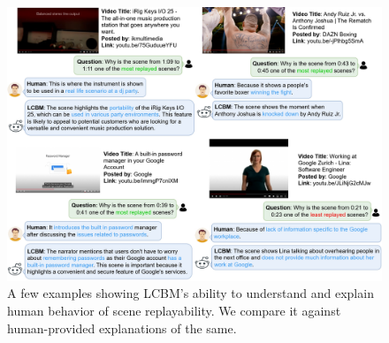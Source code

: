 \begin{figure}[!t]
    \centering
    \includegraphics[width=\textwidth]{images/replay-explains.jpeg}
    \caption{A few examples showing LCBM's ability to understand and explain human behavior of scene replayability. We compare it against human-provided explanations of the same.    \label{fig:replay-explains}}
\end{figure}






